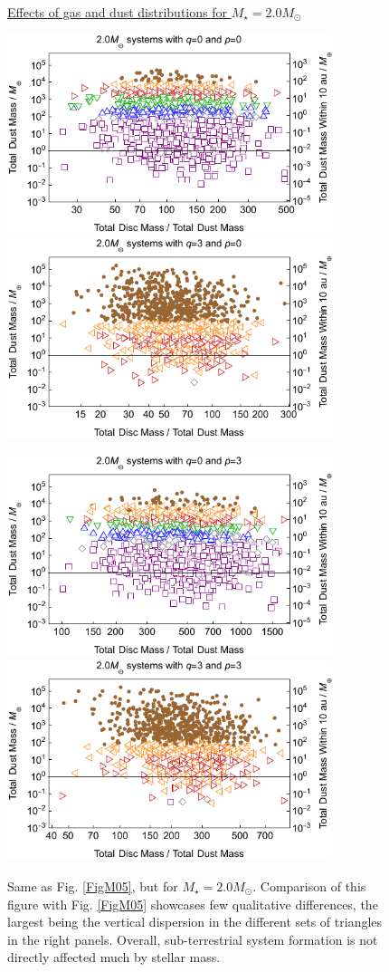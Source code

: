 \documentclass[useAMS,usenatbib]{mn2e}
\begin{document}


\begin{figure}
\centerline{\Huge \underline{Effects of gas and dust distributions for $M_{\star}=2.0M_{\odot}$}}
\centerline{}
\centerline{}
\centerline{
\includegraphics[width=9.5cm]{Plotm20q00p00}
\includegraphics[width=9.5cm]{Plotm20q30p00}
}
\centerline{}
\centerline{
\includegraphics[width=9.5cm]{Plotm20q00p30}
\includegraphics[width=9.5cm]{Plotm20q30p30}
}
\caption{
Same as Fig. \ref{FigM05}, but for $M_{\star}=2.0M_{\odot}$. Comparison of this figure with Fig. \ref{FigM05} showcases few qualitative differences, the largest being the vertical dispersion in the different sets of triangles in the right panels. Overall, sub-terrestrial system formation is not directly affected much by stellar mass.
}
\label{FigM20}
\end{figure}
\end{document}
